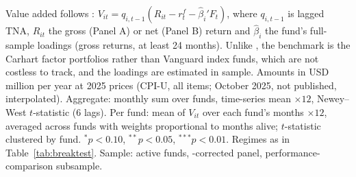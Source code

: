\begin{table}[!htbp]
\begin{minipage}{\tabletempwidth}
\ifdim\wd\tabletempbox>\linewidth
  \resizebox{\linewidth}{!}{\usebox{\tabletempbox}}
\else
  \usebox{\tabletempbox}
\fi
\par\medskip
\begin{singlespace}\tablefont\noindent
Value added follows \textcite{BerkVanBinsbergen2015}: $V_{it}=q_{i,t-1}(R_{it}-r^f_t-\hat\beta_i'F_t)$, where $q_{i,t-1}$ is lagged TNA, $R_{it}$ the gross (Panel A) or net (Panel B) return and $\hat\beta_i$ the fund's full-sample \textcite{Carhart1997} loadings (gross returns, at least 24 months). Unlike \textcite{BerkVanBinsbergen2015}, the benchmark is the Carhart factor portfolios rather than Vanguard index funds, which are not costless to track, and the loadings are estimated in sample. Amounts in USD million per year at 2025 prices (CPI-U, all items; October 2025, not published, interpolated). Aggregate: monthly sum over funds, time-series mean $\times 12$, Newey--West $t$-statistic (6 lags). Per fund: mean of $V_{it}$ over each fund's months $\times 12$, averaged across funds with weights proportional to months alive; $t$-statistic clustered by fund. $^{*}p<0.10$, $^{**}p<0.05$, $^{***}p<0.01$. Regimes as in Table~\ref{tab:breaktest}. Sample: active funds, \textcite{Evans2010}-corrected panel, performance-comparison subsample.
\end{singlespace}
\end{minipage}
\end{table}

